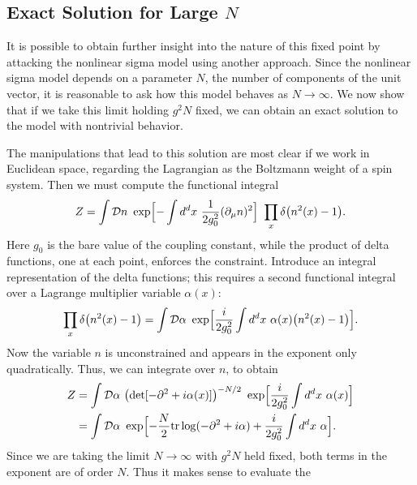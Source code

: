\subsection{Exact Solution for Large $N$}

It is possible to obtain further insight into the nature of this fixed point
by attacking the nonlinear sigma model using another approach.  Since the
nonlinear sigma model depends on a parameter $N$, the number of components of
the unit vector, it is reasonable to ask how this model behaves as
$N\to\infty$.  We now show that if we take this limit holding $g^2N$ fixed,
we can obtain an exact solution to the model with nontrivial behavior.

The manipulations that lead to this solution are most clear if we work in
Euclidean space, regarding the Lagrangian as the Boltzmann weight of a spin
system.  Then we must compute the functional integral
\begin{equation}
  Z = \int \mathcal{D}n\ \exp\Bigl[ -\int d^dx\ \frac{1}{2g_0^2}
    (\partial_\mu n)^2 \Bigr]\ \prod_x \delta\bigl( n^2(x) - 1 \bigr) .
  \label{eq:13.112}
\end{equation}
Here $g_0$ is the bare value of the coupling constant, while the product of
delta functions, one at each point, enforces the constraint.  Introduce an
integral representation of the delta functions; this requires a second
functional integral over a Lagrange multiplier variable $\alpha(x)$:
\begin{equation}
  \prod_x \delta\bigl( n^2(x) - 1 \bigr)
  = \int \mathcal{D}\alpha\ \exp\Bigl[ \frac{i}{2g_0^2}\int d^dx\
    \alpha(x)\bigl( n^2(x) - 1 \bigr) \Bigr] .
  \label{eq:13.113}
\end{equation}
Now the variable $n$ is unconstrained and appears in the exponent only
quadratically.  Thus, we can integrate over $n$, to obtain
\begin{equation}
  \begin{aligned}
    Z &= \int \mathcal{D}\alpha\ \bigl( \det[-\partial^2 + i\alpha(x)]
      \bigr)^{-N/2}\ \exp\Bigl[ \frac{i}{2g_0^2}\int d^dx\ \alpha(x) \Bigr]\\
    &= \int \mathcal{D}\alpha\ \exp\Bigl[ -\frac{N}{2}\mathrm{tr}\log
      (-\partial^2 + i\alpha) + \frac{i}{2g_0^2}\int d^dx\ \alpha \Bigr] .
  \end{aligned}
  \label{eq:13.114}
\end{equation}
Since we are taking the limit $N\to\infty$ with $g^2N$ held fixed, both terms
in the exponent are of order $N$.  Thus it makes sense to evaluate the
